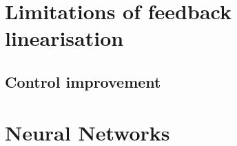 \section{Limitations of feedback linearisation}
\label{section:background/limitations}

\subsection{Control improvement}
\label{section:background/improvements}

\section{Neural Networks}
\label{section:background/NN}



